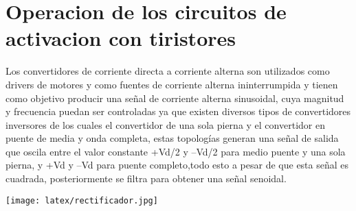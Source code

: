\documentclass[10pt,a4paper]{article}
\begin{document}
\maketitle\section{Operacion de los circuitos de activacion con tiristores}
Los  convertidores  de  corriente  directa  a  corriente  alterna  son  utilizados  como  drivers  de  motores  y  como  fuentes  de  corriente  alterna  ininterrumpida  y  tienen  como  objetivo  producir  una  señal  de  corriente  alterna  sinusoidal,  cuya  magnitud  y  frecuencia  puedan  ser  controladas ya que existen  diversos  tipos  de  convertidores  inversores  de  los  cuales  el  convertidor  de  una  sola  pierna  y  el  convertidor  en  puente  de  media  y  onda  completa, estas  topologías  generan  una  señal  de  salida  que  oscila  entre  el  valor  constante  +Vd/2  y  –Vd/2 para medio puente y una sola pierna, y +Vd y –Vd  para puente completo,todo esto a pesar  de  que  esta  señal  es  cuadrada,  posteriormente  se  filtra  para  obtener  una  señal  senoidal.


\texttt{[image: latex/rectificador.jpg]} 



 
\end{document}
